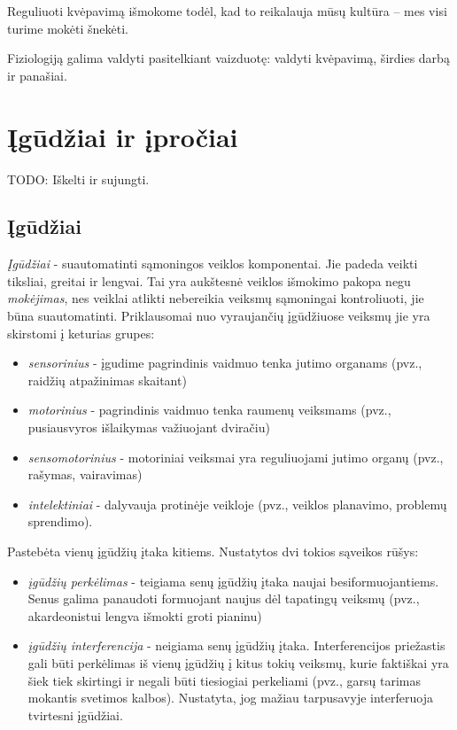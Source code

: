 Reguliuoti kvėpavimą išmokome todėl, kad to reikalauja mūsų kultūra – mes
visi turime mokėti šnekėti.

Fiziologiją galima valdyti pasitelkiant vaizduotę: valdyti kvėpavimą, 
širdies darbą ir panašiai.

\section{Įgūdžiai ir įpročiai}

\label{tema:igudziai}

TODO: Iškelti ir sujungti.

\subsection{Įgūdžiai}

\emph{Įgūdžiai} - suautomatinti sąmoningos veiklos komponentai. Jie padeda 
veikti tiksliai, greitai ir lengvai. Tai yra aukštesnė veiklos išmokimo 
pakopa negu \emph{mokėjimas}, nes veiklai atlikti nebereikia veiksmų 
sąmoningai kontroliuoti, jie būna suautomatinti. Priklausomai nuo 
vyraujančių įgūdžiuose veiksmų jie yra skirstomi į keturias grupes:
\begin{itemize}
  \item \emph{sensorinius} - įgudime pagrindinis vaidmuo tenka jutimo
  organams (pvz., raidžių atpažinimas skaitant)
  \item \emph{motorinius} - pagrindinis vaidmuo tenka raumenų veiksmams
  (pvz., pusiausvyros išlaikymas važiuojant dviračiu)
  \item \emph{sensomotorinius} - motoriniai veiksmai yra reguliuojami 
  jutimo organų (pvz., rašymas, vairavimas)
  \item \emph{intelektiniai} - dalyvauja protinėje veikloje (pvz., veiklos 
  planavimo, problemų sprendimo).
\end{itemize}

Pastebėta vienų įgūdžių įtaka kitiems. Nustatytos dvi tokios sąveikos rūšys:
\begin{itemize}
  \item \emph{įgūdžių perkėlimas} - teigiama senų įgūdžių įtaka naujai 
  besiformuojantiems. Senus galima panaudoti formuojant naujus dėl tapatingų
  veiksmų (pvz., akardeonistui lengva išmokti groti pianinu)
  \item \emph{įgūdžių interferencija} - neigiama senų įgūdžių įtaka. 
  Interferencijos priežastis gali būti perkėlimas iš vienų įgūdžių į kitus
  tokių veiksmų, kurie faktiškai yra šiek tiek skirtingi ir negali būti
  tiesiogiai perkeliami (pvz., garsų tarimas mokantis svetimos kalbos). 
  Nustatyta, jog mažiau tarpusavyje interferuoja tvirtesni įgūdžiai.
\end{itemize}

